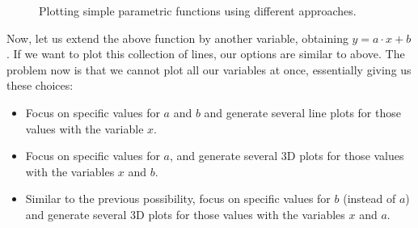 \documentclass{article}
\begin{document}
\begin{figure}[ht]
  \centering
  \caption{Plotting simple parametric functions using different approaches.}
  \label{fig:simple-parametric-functions}
\end{figure}

Now, let us extend the above function by another variable, obtaining $y = a \cdot x + b$.
If we want to plot this collection of lines, our options are similar to above.
The problem now is that we cannot plot all our variables at once, essentially giving us these choices:

\begin{itemize}
\item Focus on specific values for $a$ and $b$ and generate several line plots for those values with the variable $x$.
\item Focus on specific values for $a$, and generate several 3D plots for those values with the variables $x$ and $b$.
\item Similar to the previous possibility, focus on specific values for $b$ (instead of $a$) and generate several 3D plots for those values with the variables $x$ and $a$.
\end{itemize}
\end{document}
